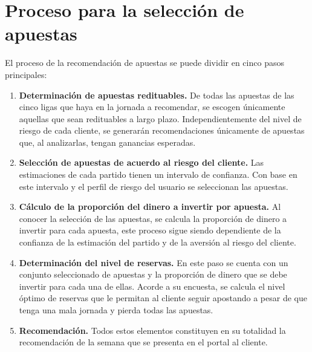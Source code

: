  \section{Proceso para la selección de apuestas}

%
%
 
 El proceso de la recomendación de apuestas se puede dividir en cinco pasos principales:

 \begin{enumerate}
 	\item \textbf{Determinación de apuestas redituables.} De todas las apuestas de las cinco ligas que haya en la jornada a recomendar, se escogen únicamente aquellas que sean redituables a largo plazo. Independientemente del nivel de riesgo de cada cliente, se generarán recomendaciones únicamente de apuestas que, al analizarlas, tengan ganancias esperadas.
 	\item \textbf{Selección de apuestas de acuerdo al riesgo del cliente.} Las estimaciones de cada partido tienen un intervalo de confianza. Con base en este intervalo y el perfil de riesgo del usuario se seleccionan las apuestas.
 	\item \textbf{Cálculo de la proporción del dinero a invertir por apuesta.} Al conocer la selección de las apuestas, se calcula la proporción de dinero a invertir para cada apuesta, este proceso sigue siendo dependiente de la confianza de la estimación del partido y de la aversión al riesgo del cliente.
 	\item \textbf{Determinación del nivel de reservas.} En este paso se cuenta con un conjunto seleccionado de apuestas y la proporción de dinero que se debe invertir para cada una de ellas. Acorde a su encuesta, se calcula el nivel óptimo de reservas que le permitan al cliente seguir apostando a pesar de que tenga una mala jornada y pierda todas las apuestas.
 	\item \textbf{Recomendación.} Todos estos elementos constituyen en su totalidad la recomendación de la semana que se presenta en el portal al cliente.
 \end{enumerate}
 

